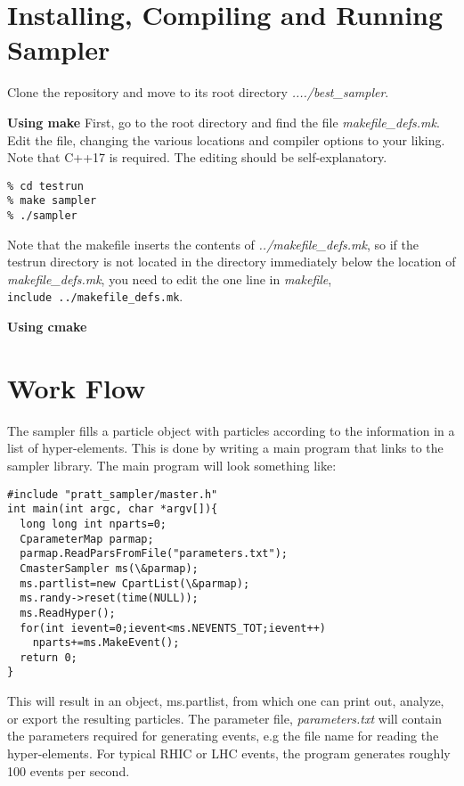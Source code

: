 



\section{Installing, Compiling and Running Sampler}

Clone the repository and move to its root directory {\it ..../best\_sampler}.

{\bf Using make}
First, go to the root directory and find the file {\it makefile\_defs.mk}. Edit the file, changing the various locations and compiler options to your liking. Note that C++17 is required. The editing should be self-explanatory.
{\tt\begin{verbatim}
% cd testrun
% make sampler
% ./sampler
\end{verbatim}}
Note that the makefile inserts the contents of {\it ../makefile\_defs.mk}, so if the testrun directory is not located in the directory immediately below the location of {\it makefile\_defs.mk}, you need to edit the one line in {\it makefile},\\
{\tt include ../makefile\_defs.mk}.

{\bf Using cmake}

\section{Work Flow}

The sampler fills a particle object with particles according to the information in a list of hyper-elements. This is done by writing a main program that links to the sampler library. The main program will look something like:

{\tt \begin{verbatim}
#include "pratt_sampler/master.h"
int main(int argc, char *argv[]){
  long long int nparts=0;
  CparameterMap parmap;
  parmap.ReadParsFromFile("parameters.txt");
  CmasterSampler ms(\&parmap);
  ms.partlist=new CpartList(\&parmap);
  ms.randy->reset(time(NULL));
  ms.ReadHyper();
  for(int ievent=0;ievent<ms.NEVENTS_TOT;ievent++)
    nparts+=ms.MakeEvent();
  return 0;
}
\end{verbatim}}
This will result in an object, ms.partlist, from which one can print out, analyze, or export the resulting particles. The parameter file, {\it parameters.txt} will contain the parameters required for generating events, e.g the file name for reading the hyper-elements. For typical RHIC or LHC events, the program generates roughly 100 events per second. 

